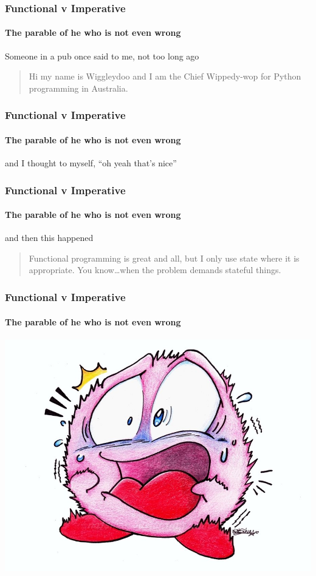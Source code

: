 {

\begin{frame}
\frametitle{Functional v Imperative}
\framesubtitle{The parable of he who is not even wrong}
Someone in a pub once said to me, not too long ago
\begin{quote}
Hi my name is Wiggleydoo and I am the Chief Wippedy-wop for Python programming in Australia.
\end{quote}
\end{frame}


\begin{frame}
\frametitle{Functional v Imperative}
\framesubtitle{The parable of he who is not even wrong}
and I thought to myself, ``oh yeah that's nice''
\end{frame}


\begin{frame}
\frametitle{Functional v Imperative}
\framesubtitle{The parable of he who is not even wrong}
and then this happened
\begin{quote}
Functional programming is great and all, but I only use state where it is appropriate. You know\ldots when the problem demands stateful things.
\end{quote}
\end{frame}


\begin{frame}
\frametitle{Functional v Imperative}
\framesubtitle{The parable of he who is not even wrong}
\begin{center}
\includegraphics[width=0.7\paperwidth]{image/shock.jpg}
\end{center}
\end{frame}


}
